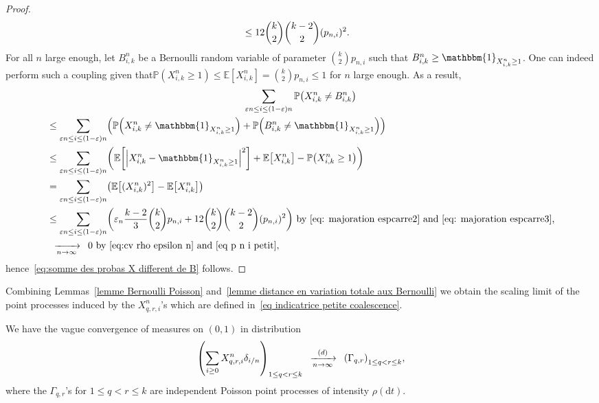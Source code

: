 \documentclass[AHL,Unicode,published]{cedram}
\newcommand{\e}{\varepsilon}
\newcommand{\cv}[1][n]{\enskip\xrightarrow[#1 \to \infty]{}\enskip}
\newcommand{\cvloi}[1][n]{\enskip\xrightarrow[#1 \to \infty]{(d)}\enskip}
\newcommand{\rmd}{\mathrm{d}}
\renewcommand{\P}{{\mathbb{P}}}
\newcommand{\E}{\mathbb{E}}
\newcommand{\1}{\mathbbm{1}}
\let\originalleft\left
\let\originalright\right
\renewcommand{\left}{\mathopen{}\mathclose\bgroup\originalleft}
\renewcommand{\right}{\aftergroup\egroup\originalright}
\renewcommand*{\to}{\mathchoice{\longrightarrow}{\rightarrow}{\rightarrow}{\rightarrow}}
\begin{document}
\begin{proof}
\begin{align}
&\le 12\binom{k}{2}\binom{k-2}{2} (p_{n,i})^2. \notag
\end{align}
\endgroup
For all $n$ large enough, let $B^n_{i,k}$ be a Bernoulli random variable of parameter $\binom{k}{2} p_{n,i}$ such that $B^n_{i,k}\ge \1_{X^n_{i,k}\ge 1}$. One can indeed perform such a coupling given that\linebreak $\P(X^n_{i,k}\ge 1) \le \E[X^n_{i,k}]=\binom{k}{2} p_{n,i} \le 1$ for $n$ large enough. As a result,
\begin{multline*}
\sum_{\e n \le i \le (1-\e) n } \P\left(X^n_{i,k} \neq B^n_{i,k}\right)\\
\begin{aligned}
&\le \sum_{\e n \le i \le (1-\e) n } \left(\P\left(X^n_{i,k} \neq \1_{X^n_{i,k}\ge 1}\right) +
\P\left(B^n_{i,k} \neq \1_{X^n_{i,k}\ge 1}\right)
\right)\\
&\le \sum_{\e n \le i \le (1-\e) n } \left(
\E\left[
\left| X^n_{i,k} - \1_{X^n_{i,k}\ge 1}
\right|^2
\right] +\E\left[X^n_{i,k}
\right] -\P\left(X^n_{i,k}\ge1\right)
\right)
\\
&= \sum_{\e n \le i \le (1-\e) n } \left(
\E\left[(X^n_{i,k})^2\right] -\E\left[X^n_{i,k}
\right]
\right) \\
&\le
\sum_{\e n \le i \le (1-\e) n } \left(
\e_n \frac{k-2}{3} \binom{k}{2} p_{n,i} + 12 \binom{k}{2}\binom{k-2}{2} (p_{n,i})^2
\right) \text{ by~\eqref{eq: majoration espcarre2} and~\eqref{eq: majoration espcarre3},}
\\
&\cv[n] 0 \text{ by~\eqref{eq:cv rho epsilon n} and~\eqref{eq p n i petit}},
\end{aligned}
\end{multline*}
hence~\eqref{eq:somme des probas X different de B} {follows}.
\end{proof}

Combining Lemmas~\ref{lemme Bernoulli Poisson} and~\ref{lemme distance en variation totale aux Bernoulli} we obtain the scaling limit of the point processes induced by the $X^n_{q,r,i}$'s which are defined in~\eqref{eq indicatrice petite coalescence}.

\begin{coro}\label{cor: cv petites coalescences}
We have the {vague} convergence of measures on $(0,1)$ in distribution
\[
\left(\sum_{i\ge 0} X^n_{q,r,i} \delta_{i/n} \right)_{1 \le q<r \le k}
\cvloi[n]
\left(\Gamma_{q,r}\right)_{1 \le q<r \le k},
\]
where the $\Gamma_{q,r}$'s for $1 \le q<r\le k$ are independent Poisson point processes of intensity $\rho(\rmd t)$.
\end{coro}
\end{document}
